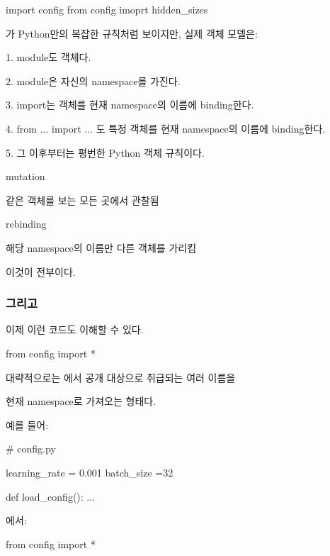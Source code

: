 \begin{dhkcode}
import config
from config imoprt hidden_sizes
\end{dhkcode}

가 Python만의 복잡한 규칙처럼 보이지만, 실제 객체 모델은:

\begin{dhksmry}
    1. module도 객체다.

    2. module은 자신의 namespace를 가진다.

    3. import는 객체를 현재 namespace의 이름에 binding한다.

    4. from ... import ... 도 특정 객체를 
        현재 namespace의 이름에 binding한다.

    5. 그 이후부터는 평번한 Python 객체 규칙이다.
\end{dhksmry}

\begin{dhksmry}[centered]
mutation

\da

같은 객체를 보는 모든 곳에서 관찰됨



rebinding

\da

해당 namespace의 이름만 다른 객체를 가리킴
\end{dhksmry}

이것이 전부이다.

\subsubsection{그리고 }

이제 이런 코드도 이해할 수 있다.

\begin{dhkcode}
from config import *
\end{dhkcode}

대략적으로는 에서 공개 대상으로 취급되는 여러 이름을 

현재 namespace로 가져오는 형태다.

예를 들어:

\begin{dhkcode}
# config.py

learning_rate = 0.001
batch_size =32

def load_config():
    ...
\end{dhkcode}

에서:

\begin{dhkcode}
from config import *
\end{dhkcode}

